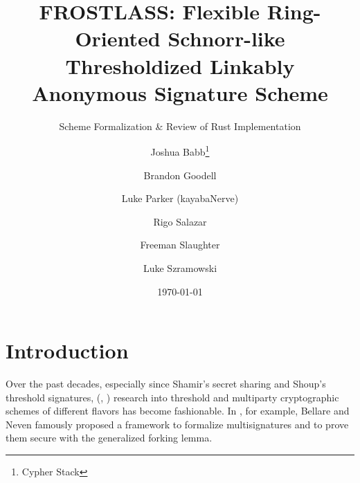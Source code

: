 \documentclass[11pt]{article}
\title{FROSTLASS: Flexible Ring-Oriented Schnorr-like Thresholdized Linkably Anonymous Signature Scheme}
\subtitle{Scheme Formalization \& Review of Rust Implementation}
\author{
    Joshua Babb\thanks{Cypher Stack} \\ %
    \and
    Brandon Goodell\protect\footnotemark[1] \\ %
    \and
    Luke Parker (kayabaNerve) \\
    \and 
    Rigo Salazar\protect\footnotemark[1] \\ %
    \and
    Freeman Slaughter\protect\footnotemark[1] \\
    \and 
    Luke Szramowski\protect\footnotemark[1]
}
\date{\today}
\theoremstyle{definition}
\newcommand{\bran}[1]{{\textcolor{Rhodamine}{#1}}}
\newcommand{\free}[1]{{\textcolor{Red}{#1}}}
\newcommand{\luke}[1]{{\textcolor{ForestGreen}{#1}}}
\newcommand{\rigo}[1]{{\textcolor{Blue}{#1}}}
\begin{document}
\maketitle

\section{Introduction}











Over the past decades, especially since Shamir's secret sharing and Shoup's threshold signatures, (\cite{shamir1979share}, \cite{shoup2000practical}) research into threshold and multiparty cryptographic schemes of different flavors has become fashionable. In \cite{bellare2006multi}, for example, Bellare and Neven famously proposed a framework to formalize multisignatures and to prove them secure with the generalized forking lemma. 
\end{document}
